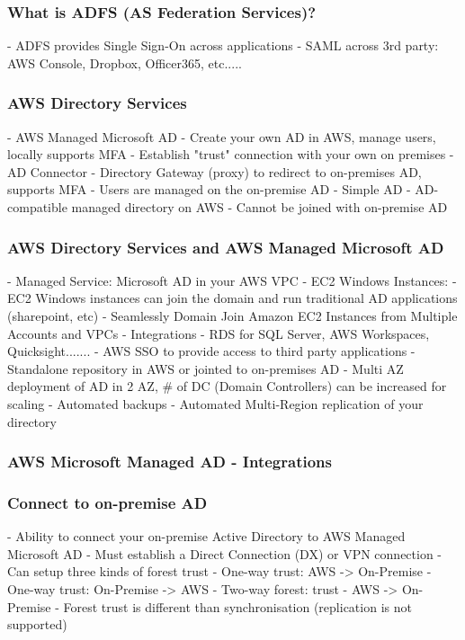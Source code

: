 \documentclass[11pt]{book}
\begin{document}
    \subsubsection{What is ADFS (AS Federation Services)?}
    - ADFS provides Single Sign-On across applications
    - SAML across 3rd party: AWS Console, Dropbox, Officer365, etc.....

    \subsubsection{AWS Directory Services}
    - AWS Managed Microsoft AD
    - Create your own AD in AWS, manage users, locally supports MFA
    - Establish "trust" connection with your own on premises
    - AD Connector
    - Directory Gateway (proxy) to redirect to on-premises AD, supports MFA
    - Users are managed on the on-premise AD
    - Simple AD
    - AD-compatible managed directory on AWS
    - Cannot be joined with on-premise AD

    \subsubsection{AWS Directory Services and AWS Managed Microsoft AD}
    - Managed Service: Microsoft AD in your AWS VPC
    - EC2 Windows Instances:
    - EC2 Windows instances can join the domain and run traditional AD applications (sharepoint, etc)
    - Seamlessly Domain Join Amazon EC2 Instances from Multiple Accounts and VPCs
    - Integrations
    - RDS for SQL Server, AWS Workspaces, Quicksight.......
    - AWS SSO to provide access to third party applications
    - Standalone repository in AWS or jointed to on-premises AD
    - Multi AZ deployment of AD in 2 AZ, # of DC (Domain Controllers) can be increased for scaling
    - Automated backups
    - Automated Multi-Region replication of your directory

    \subsubsection{AWS Microsoft Managed AD - Integrations}

    \subsubsection{Connect to on-premise AD}
    - Ability to connect your on-premise Active Directory to AWS Managed Microsoft AD
    - Must establish a Direct Connection (DX) or VPN connection
    - Can setup three kinds of forest trust
    - One-way trust: AWS -> On-Premise
    - One-way trust: On-Premise -> AWS
    - Two-way forest: trust - AWS -> On-Premise
    - Forest trust is different than synchronisation (replication is not supported)
\end{document}
